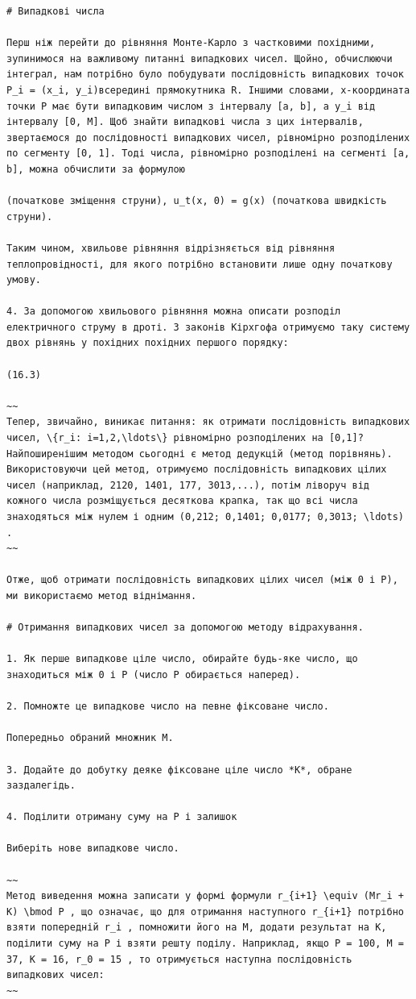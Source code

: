 \documentclass[
  ukrainian,
]{article}
\begin{document}
\begin{verbatim}
# Випадкові числа

Перш ніж перейти до рівняння Монте-Карло з частковими похідними, зупинимося на важливому питанні випадкових чисел. Щойно, обчислюючи інтеграл, нам потрібно було побудувати послідовність випадкових точок P_i = (x_i, y_i)всередині прямокутника R. Іншими словами, x-координата точки P має бути випадковим числом з інтервалу [a, b], а y_i від інтервалу [0, M]. Щоб знайти випадкові числа з цих інтервалів, звертаємося до послідовності випадкових чисел, рівномірно розподілених по сегменту [0, 1]. Тоді числа, рівномірно розподілені на сегменті [a, b], можна обчислити за формулою

(початкове зміщення струни), u_t(x, 0) = g(x) (початкова швидкість струни).

Таким чином, хвильове рівняння відрізняється від рівняння теплопровідності, для якого потрібно встановити лише одну початкову умову.

4. За допомогою хвильового рівняння можна описати розподіл електричного струму в дроті. З законів Кірхгофа отримуємо таку систему двох рівнянь у похідних похідних першого порядку:

(16.3)

~~
Тепер, звичайно, виникає питання: як отримати послідовність випадкових чисел, \{r_i: i=1,2,\ldots\} рівномірно розподілених на [0,1]? Найпоширенішим методом сьогодні є метод дедукцій (метод порівнянь). Використовуючи цей метод, отримуємо послідовність випадкових цілих чисел (наприклад, 2120, 1401, 177, 3013,...), потім ліворуч від кожного числа розміщується десяткова крапка, так що всі числа знаходяться між нулем і одним (0,212; 0,1401; 0,0177; 0,3013; \ldots) .
~~

Отже, щоб отримати послідовність випадкових цілих чисел (між 0 і P), ми використаємо метод віднімання.

# Отримання випадкових чисел за допомогою методу відрахування.

1. Як перше випадкове ціле число, обирайте будь-яке число, що знаходиться між 0 і P (число P обирається наперед).

2. Помножте це випадкове число на певне фіксоване число.

Попередньо обраний множник M.

3. Додайте до добутку деяке фіксоване ціле число *K*, обране заздалегідь.

4. Поділити отриману суму на P і залишок

Виберіть нове випадкове число.

~~
Метод виведення можна записати у формі формули r_{i+1} \equiv (Mr_i + K) \bmod P , що означає, що для отримання наступного r_{i+1} потрібно взяти попередній r_i , помножити його на M, додати результат на K, поділити суму на P і взяти решту поділу. Наприклад, якщо P = 100, M = 37, K = 16, r_0 = 15 , то отримується наступна послідовність випадкових чисел:
~~


\end{verbatim}
\end{document}
